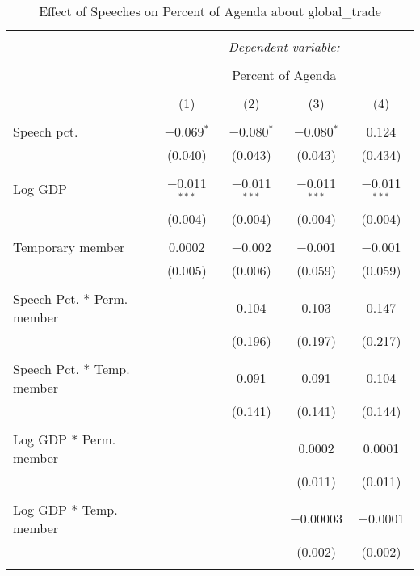 
\begin{table}[!htbp] \centering 
  \caption{Effect of Speeches on Percent of Agenda about  global_trade} 
  \label{} 
\begin{tabular}{@{\extracolsep{5pt}}lcccc} 
\\[-1.8ex]\hline 
\hline \\[-1.8ex] 
 & \multicolumn{4}{c}{\textit{Dependent variable:}} \\ 
\cline{2-5} 
\\[-1.8ex] & \multicolumn{4}{c}{Percent of Agenda} \\ 
\\[-1.8ex] & (1) & (2) & (3) & (4)\\ 
\hline \\[-1.8ex] 
 Speech pct. & $-$0.069$^{*}$ & $-$0.080$^{*}$ & $-$0.080$^{*}$ & 0.124 \\ 
  & (0.040) & (0.043) & (0.043) & (0.434) \\ 
  & & & & \\ 
 Log GDP & $-$0.011$^{***}$ & $-$0.011$^{***}$ & $-$0.011$^{***}$ & $-$0.011$^{***}$ \\ 
  & (0.004) & (0.004) & (0.004) & (0.004) \\ 
  & & & & \\ 
 Temporary member & 0.0002 & $-$0.002 & $-$0.001 & $-$0.001 \\ 
  & (0.005) & (0.006) & (0.059) & (0.059) \\ 
  & & & & \\ 
 Speech Pct. * Perm. member &  & 0.104 & 0.103 & 0.147 \\ 
  &  & (0.196) & (0.197) & (0.217) \\ 
  & & & & \\ 
 Speech Pct. * Temp. member &  & 0.091 & 0.091 & 0.104 \\ 
  &  & (0.141) & (0.141) & (0.144) \\ 
  & & & & \\ 
 Log GDP * Perm. member &  &  & 0.0002 & 0.0001 \\ 
  &  &  & (0.011) & (0.011) \\ 
  & & & & \\ 
 Log GDP * Temp. member &  &  & $-$0.00003 & $-$0.0001 \\ 
  &  &  & (0.002) & (0.002) \\ 
  & & & & \\ 

\end{tabular}
\end{table}
